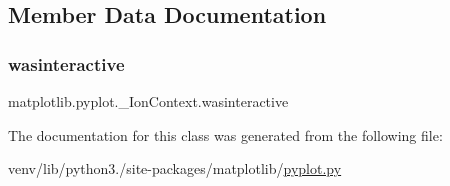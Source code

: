 \subsection{Member Data Documentation}
\mbox{\label{classmatplotlib_1_1pyplot_1_1__IonContext_a2ad21ce6bd182b495ee91029e603617e}} 
\subsubsection{\texorpdfstring{wasinteractive}{wasinteractive}}
{\footnotesize\ttfamily matplotlib.\+pyplot.\+\_\+\+Ion\+Context.\+wasinteractive}



The documentation for this class was generated from the following file\+:\begin{DoxyCompactItemize}
\item 
venv/lib/python3./site-\/packages/matplotlib/\hyperlink{pyplot_8py}{pyplot.\+py}\end{DoxyCompactItemize}
